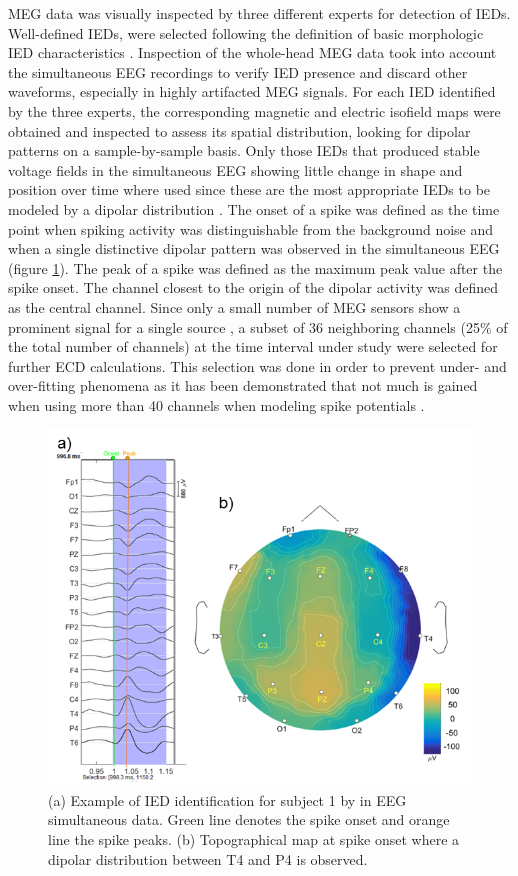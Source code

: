 MEG data was visually inspected by three different experts for detection of IEDs. Well-defined IEDs, were selected following the definition of basic morphologic IED characteristics \citep{Nowak2009,Jaseja2012}. Inspection of the whole-head MEG data took into account the simultaneous EEG recordings to verify IED presence and discard other waveforms, especially in highly artifacted MEG signals. For each IED identified by the three experts, the corresponding magnetic and electric isofield maps were obtained and inspected to assess its spatial distribution, looking for dipolar patterns on a sample-by-sample basis. Only those IEDs that produced stable voltage fields in the simultaneous EEG showing little change in shape and position over time where used since these are the most appropriate IEDs to be modeled by a dipolar distribution \citep{Townsend2008}. The onset of a spike was defined as the time point when spiking activity was distinguishable from the background noise and when a single distinctive dipolar pattern was observed in the simultaneous EEG (figure \ref{fig:2-1}). The peak of a spike was defined as the maximum peak value after the spike onset. The channel closest to the origin of the dipolar activity was defined as the central channel. Since only a small number of MEG sensors show a prominent signal for a single source \citep{Hamalainen1993}, a subset of 36 neighboring channels (25\% of the total number of channels) at the time interval under study were selected for further ECD calculations. This selection was done in order to prevent under- and over-fitting phenomena as it has been demonstrated that not much is gained when using more than 40 channels when modeling spike potentials \citep{Ebersole2003}.

\begin{figure}[h]
\centering
\includegraphics[width=1\textwidth]{Images/fig2-1.png}
\caption{(a) Example of IED identification for subject 1 by in EEG simultaneous data. Green line denotes the spike onset and orange line the spike peaks. (b) Topographical map at spike onset where a dipolar distribution between T4 and P4 is observed.}
\label{fig:2-1}
\end{figure} 


